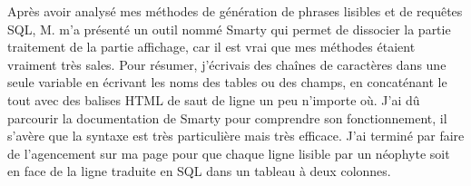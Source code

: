 Après avoir analysé mes méthodes de génération de phrases lisibles et de
requêtes SQL, M. m'a présenté un outil nommé \og Smarty \fg{} qui
permet de dissocier la partie traitement de la partie affichage, car il est
vrai que mes méthodes étaient vraiment très sales. Pour résumer, j'écrivais des
chaînes de caractères dans une seule variable en écrivant les noms des tables
ou des champs, en concaténant le tout avec des balises HTML de saut de ligne un
peu n'importe où. J'ai dû parcourir la documentation de Smarty pour comprendre
son fonctionnement, il s'avère que la syntaxe est très particulière mais très
efficace. J'ai terminé par faire de l'agencement sur ma page pour que chaque
ligne lisible par un néophyte soit en face de la ligne traduite en SQL dans un
tableau à deux colonnes.

\clearpage
